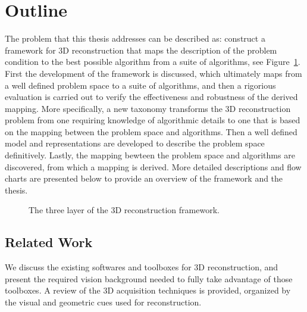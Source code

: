 
\section{Outline}
The problem that this thesis addresses can be described as: construct a framework for 3D reconstruction that maps the description of the problem condition to the best possible algorithm from a suite of algorithms, see Figure~\ref{fig:framework_overview}. First the development of the framework is discussed, which ultimately maps from a well defined problem space to a suite of algorithms, and then a rigorious evaluation is carried out to verify the effectiveness and robustness of the derived mapping. More specifically, a new taxonomy transforms the 3D reconstruction problem from one requiring knowledge of algorithmic details to one that is based on the mapping between the problem space and algorithms. Then a well defined model and representations are developed to describe the problem space definitively. Lastly, the mapping bewteen the problem space and algorithms are discovered, from which a mapping is derived. More detailed descriptions and flow charts are presented below to provide an overview of the framework and the thesis.
\begin{figure}[!htbp]
\centering
{}
\caption{The three layer of the 3D reconstruction framework.}
\label{fig:framework_overview}
\end{figure}

\subsection{Related Work}
We discuss the existing softwares and toolboxes for 3D reconstruction, and present the required vision background needed to fully take advantage of those toolboxes. A review of the 3D acquisition techniques is provided, organized by the visual and geometric cues used for reconstruction.

